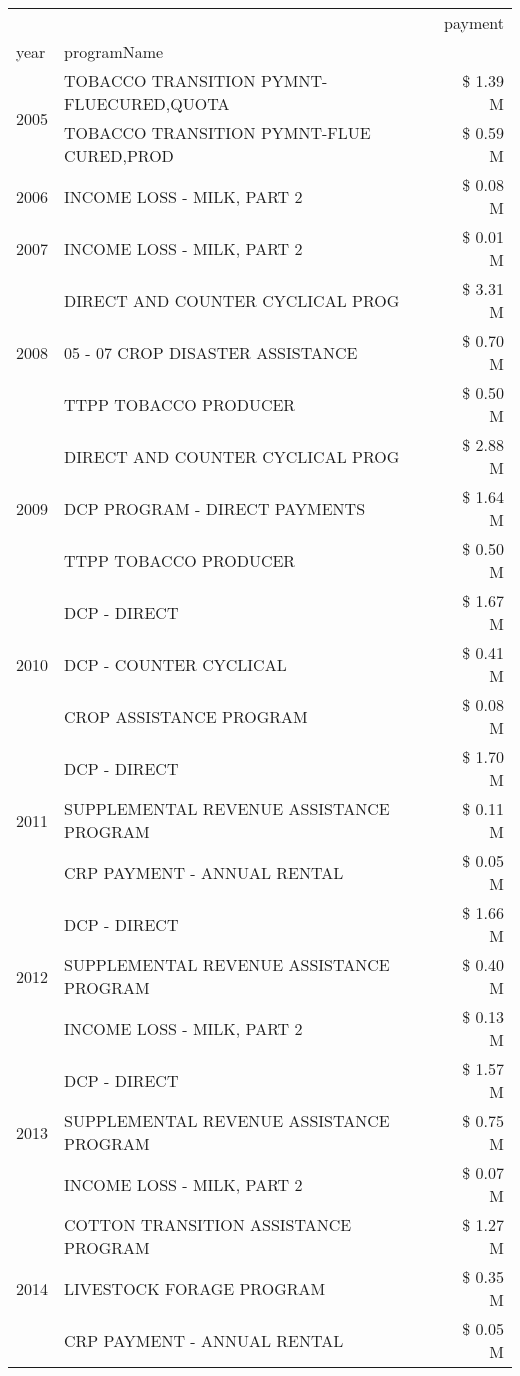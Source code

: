 \begin{tabular}{llr}
\toprule
 &  & payment \\
year & programName &  \\
\midrule
\multirow[t]{2}{*}{2005} & TOBACCO TRANSITION PYMNT-FLUECURED,QUOTA & \$ 1.39 M \\
 & TOBACCO TRANSITION PYMNT-FLUE CURED,PROD & \$ 0.59 M \\
\cline{1-3}
2006 & INCOME LOSS - MILK, PART 2 & \$ 0.08 M \\
\cline{1-3}
2007 & INCOME LOSS - MILK, PART 2 & \$ 0.01 M \\
\cline{1-3}
\multirow[t]{3}{*}{2008} & DIRECT AND COUNTER CYCLICAL PROG & \$ 3.31 M \\
 & 05 - 07 CROP DISASTER ASSISTANCE & \$ 0.70 M \\
 & TTPP TOBACCO PRODUCER & \$ 0.50 M \\
\cline{1-3}
\multirow[t]{3}{*}{2009} & DIRECT AND COUNTER CYCLICAL PROG & \$ 2.88 M \\
 & DCP PROGRAM - DIRECT PAYMENTS & \$ 1.64 M \\
 & TTPP TOBACCO PRODUCER & \$ 0.50 M \\
\cline{1-3}
\multirow[t]{3}{*}{2010} & DCP - DIRECT & \$ 1.67 M \\
 & DCP - COUNTER CYCLICAL & \$ 0.41 M \\
 & CROP ASSISTANCE PROGRAM & \$ 0.08 M \\
\cline{1-3}
\multirow[t]{3}{*}{2011} & DCP - DIRECT & \$ 1.70 M \\
 & SUPPLEMENTAL REVENUE ASSISTANCE PROGRAM & \$ 0.11 M \\
 & CRP PAYMENT - ANNUAL RENTAL & \$ 0.05 M \\
\cline{1-3}
\multirow[t]{3}{*}{2012} & DCP - DIRECT & \$ 1.66 M \\
 & SUPPLEMENTAL REVENUE ASSISTANCE PROGRAM & \$ 0.40 M \\
 & INCOME LOSS - MILK, PART 2 & \$ 0.13 M \\
\cline{1-3}
\multirow[t]{3}{*}{2013} & DCP - DIRECT & \$ 1.57 M \\
 & SUPPLEMENTAL REVENUE ASSISTANCE PROGRAM & \$ 0.75 M \\
 & INCOME LOSS - MILK, PART 2 & \$ 0.07 M \\
\cline{1-3}
\multirow[t]{3}{*}{2014} & COTTON TRANSITION ASSISTANCE PROGRAM & \$ 1.27 M \\
 & LIVESTOCK FORAGE PROGRAM & \$ 0.35 M \\
 & CRP PAYMENT - ANNUAL RENTAL & \$ 0.05 M \\

\end{tabular}
